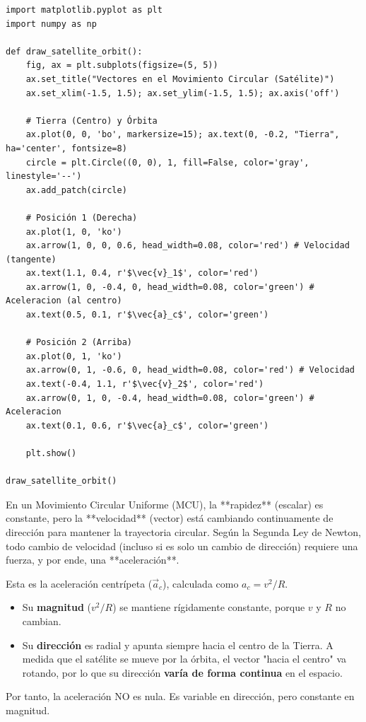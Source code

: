 \documentclass[12pt, a4paper]{article}
\begin{document}
\begin{lstlisting}
import matplotlib.pyplot as plt
import numpy as np

def draw_satellite_orbit():
    fig, ax = plt.subplots(figsize=(5, 5))
    ax.set_title("Vectores en el Movimiento Circular (Satélite)")
    ax.set_xlim(-1.5, 1.5); ax.set_ylim(-1.5, 1.5); ax.axis('off')
    
    # Tierra (Centro) y Órbita
    ax.plot(0, 0, 'bo', markersize=15); ax.text(0, -0.2, "Tierra", ha='center', fontsize=8)
    circle = plt.Circle((0, 0), 1, fill=False, color='gray', linestyle='--')
    ax.add_patch(circle)
    
    # Posición 1 (Derecha)
    ax.plot(1, 0, 'ko')
    ax.arrow(1, 0, 0, 0.6, head_width=0.08, color='red') # Velocidad (tangente)
    ax.text(1.1, 0.4, r'$\vec{v}_1$', color='red')
    ax.arrow(1, 0, -0.4, 0, head_width=0.08, color='green') # Aceleracion (al centro)
    ax.text(0.5, 0.1, r'$\vec{a}_c$', color='green')

    # Posición 2 (Arriba)
    ax.plot(0, 1, 'ko')
    ax.arrow(0, 1, -0.6, 0, head_width=0.08, color='red') # Velocidad
    ax.text(-0.4, 1.1, r'$\vec{v}_2$', color='red')
    ax.arrow(0, 1, 0, -0.4, head_width=0.08, color='green') # Aceleracion
    ax.text(0.1, 0.6, r'$\vec{a}_c$', color='green')

    plt.show()

draw_satellite_orbit()
\end{lstlisting}

En un Movimiento Circular Uniforme (MCU), la **rapidez** (escalar) es constante, pero la **velocidad** (vector) está cambiando continuamente de dirección para mantener la trayectoria circular. 
Según la Segunda Ley de Newton, todo cambio de velocidad (incluso si es solo un cambio de dirección) requiere una fuerza, y por ende, una **aceleración**.

Esta es la aceleración centrípeta ($\vec{a}_c$), calculada como $a_c = v^2/R$.
\begin{itemize}
    \item Su \textbf{magnitud} ($v^2/R$) se mantiene rígidamente constante, porque $v$ y $R$ no cambian.
    \item Su \textbf{dirección} es radial y apunta siempre hacia el centro de la Tierra. A medida que el satélite se mueve por la órbita, el vector "hacia el centro" va rotando, por lo que su dirección \textbf{varía de forma continua} en el espacio.
\end{itemize}
Por tanto, la aceleración NO es nula. Es variable en dirección, pero constante en magnitud.
\end{document}
